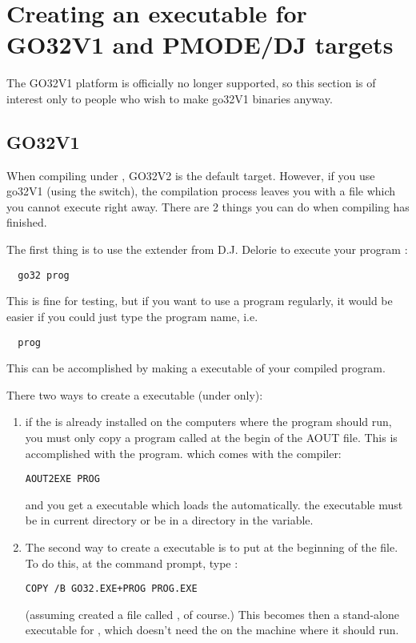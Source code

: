 \documentclass{book}
\begin{document}
\section{Creating an executable for GO32V1 and PMODE/DJ targets}
\label{go32v1}

The GO32V1 platform is officially no longer supported, so this section
is of interest only to people who wish to make go32V1 binaries anyway.

%
%
\subsection{GO32V1}
When compiling under \dos, GO32V2 is the default target. However, if you use
go32V1 (using the  switch), the
compilation process leaves you with a file which you cannot execute right away.
There are 2 things you can do when compiling has finished.

The first thing is to use the \dos extender from D.J. Delorie to execute
your program :
\begin{verbatim}
  go32 prog
\end{verbatim}
This is fine for testing, but if you want to use a program regularly, it
would be easier if you could just type the program name, i.e.
\begin{verbatim}
  prog
\end{verbatim}
This can be accomplished by making a \dos executable of your compiled program.

There two ways to create a \dos executable (under \dos only):
\begin{enumerate}
\item if the  is already
installed on the computers where the program should run, you must
only copy a program called  at the begin of
the AOUT file. This is accomplished with the  program.
which comes with the compiler:
\begin{verbatim}
AOUT2EXE PROG
\end{verbatim}
and you get a \dos executable which loads the  automatically.
the  executable must be in current directory or be
in a directory in the  variable.
\item
The second way to create a \dos executable is to put
 at the beginning of the  file. To do this, at the
command prompt, type :
\begin{verbatim}
COPY /B GO32.EXE+PROG PROG.EXE
\end{verbatim}
(assuming \fpc created a file called , of course.)
This becomes then a stand-alone executable for \dos, which doesn't need the
 on the machine where it should run.
\end{enumerate}
\end{document}
